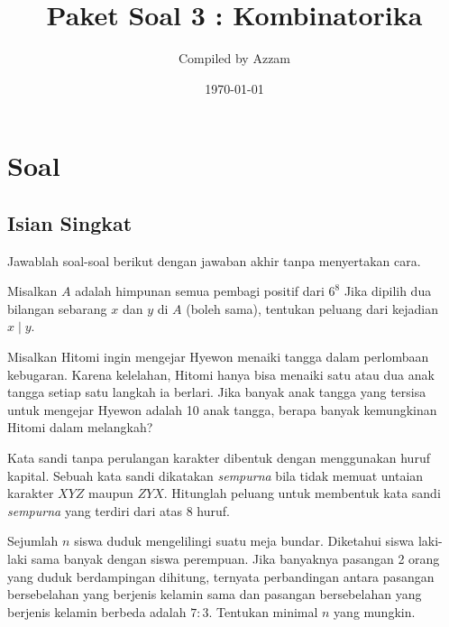 \documentclass[12pt]{scrartcl}
\begin{document}
	\title{Paket Soal 3 : Kombinatorika} %
	\date{\today}
	\author{Compiled by Azzam}
	\maketitle

\renewcommand*\contentsname{Daftar Isi}
\tableofcontents

\newpage
	\newpage
	
	\section{Soal}
\subsection{Isian Singkat}
Jawablah soal-soal berikut dengan jawaban akhir tanpa menyertakan cara.

	\begin{soalbaru}
		Misalkan $A$ adalah himpunan semua pembagi positif dari $6^8$ Jika dipilih dua bilangan sebarang $x$ dan $y$ di $A$ (boleh sama), tentukan peluang dari kejadian $x \mid y$. 
	\end{soalbaru}
	
	\begin{soalbaru}
		Misalkan Hitomi ingin mengejar Hyewon menaiki tangga dalam perlombaan kebugaran. Karena kelelahan, Hitomi hanya bisa menaiki satu atau dua anak tangga setiap satu langkah ia berlari. Jika banyak anak tangga yang tersisa untuk mengejar Hyewon adalah 10 anak tangga, berapa banyak kemungkinan Hitomi dalam melangkah?
	\end{soalbaru}
	
	\begin{soalbaru}
		Kata sandi tanpa perulangan karakter dibentuk dengan menggunakan huruf kapital. Sebuah kata sandi dikatakan \textit{sempurna} bila tidak memuat untaian karakter $XYZ$ maupun $ZYX$. Hitunglah peluang untuk membentuk kata sandi \textit{sempurna} yang terdiri dari atas 8 huruf.
	\end{soalbaru}
	
	\begin{soalbaru}
			Sejumlah $n$ siswa duduk mengelilingi suatu meja bundar. Diketahui siswa laki-laki sama banyak dengan siswa perempuan. Jika banyaknya pasangan 2 orang yang duduk berdampingan
			dihitung, ternyata perbandingan antara pasangan bersebelahan yang berjenis kelamin sama dan
			pasangan bersebelahan yang berjenis kelamin berbeda adalah $7 : 3$. Tentukan minimal $n$ yang
			mungkin.
		\end{soalbaru}
	
\end{document}
